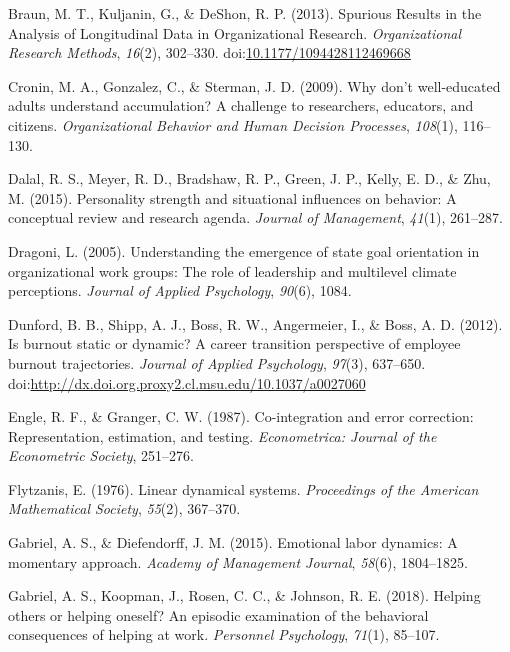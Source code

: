 \documentclass[english,,man]{apa6}
\theoremstyle{definition}
\theoremstyle{definition}
\theoremstyle{definition}
\theoremstyle{remark}
\begin{document}
\leavevmode\hypertarget{ref-braun_spurious_2013}{}%
Braun, M. T., Kuljanin, G., \& DeShon, R. P. (2013). Spurious Results in
the Analysis of Longitudinal Data in Organizational Research.
\emph{Organizational Research Methods}, \emph{16}(2), 302--330.
doi:\href{https://doi.org/10.1177/1094428112469668}{10.1177/1094428112469668}

\leavevmode\hypertarget{ref-cronin2009don}{}%
Cronin, M. A., Gonzalez, C., \& Sterman, J. D. (2009). Why don't
well-educated adults understand accumulation? A challenge to
researchers, educators, and citizens. \emph{Organizational Behavior and
Human Decision Processes}, \emph{108}(1), 116--130.

\leavevmode\hypertarget{ref-dalal2015personality}{}%
Dalal, R. S., Meyer, R. D., Bradshaw, R. P., Green, J. P., Kelly, E. D.,
\& Zhu, M. (2015). Personality strength and situational influences on
behavior: A conceptual review and research agenda. \emph{Journal of
Management}, \emph{41}(1), 261--287.

\leavevmode\hypertarget{ref-dragoni2005understanding}{}%
Dragoni, L. (2005). Understanding the emergence of state goal
orientation in organizational work groups: The role of leadership and
multilevel climate perceptions. \emph{Journal of Applied Psychology},
\emph{90}(6), 1084.

\leavevmode\hypertarget{ref-dunford_is_2012}{}%
Dunford, B. B., Shipp, A. J., Boss, R. W., Angermeier, I., \& Boss, A.
D. (2012). Is burnout static or dynamic? A career transition perspective
of employee burnout trajectories. \emph{Journal of Applied Psychology},
\emph{97}(3), 637--650.
doi:\href{https://doi.org/http://dx.doi.org.proxy2.cl.msu.edu/10.1037/a0027060}{http://dx.doi.org.proxy2.cl.msu.edu/10.1037/a0027060}

\leavevmode\hypertarget{ref-engle_co-integration_1987}{}%
Engle, R. F., \& Granger, C. W. (1987). Co-integration and error
correction: Representation, estimation, and testing. \emph{Econometrica:
Journal of the Econometric Society}, 251--276.

\leavevmode\hypertarget{ref-flytzanis1976linear}{}%
Flytzanis, E. (1976). Linear dynamical systems. \emph{Proceedings of the
American Mathematical Society}, \emph{55}(2), 367--370.

\leavevmode\hypertarget{ref-gabriel_emotional_2015}{}%
Gabriel, A. S., \& Diefendorff, J. M. (2015). Emotional labor dynamics:
A momentary approach. \emph{Academy of Management Journal},
\emph{58}(6), 1804--1825.

\leavevmode\hypertarget{ref-gabriel_helping_2018}{}%
Gabriel, A. S., Koopman, J., Rosen, C. C., \& Johnson, R. E. (2018).
Helping others or helping oneself? An episodic examination of the
behavioral consequences of helping at work. \emph{Personnel Psychology},
\emph{71}(1), 85--107.
\end{document}
